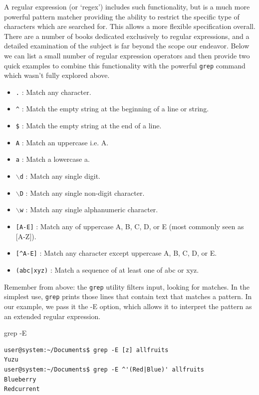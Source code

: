 \documentclass[11pt]{article}
\begin{document}
A regular expression (or `regex') includes such functionality, but is a much more powerful pattern matcher providing the ability to restrict the specific type of characters which are searched for. This allows a more flexible specification overall. There are a number of books dedicated exclusively to regular expressions, and a detailed examination of the subject is far beyond the scope our endeavor. Below we can list a small number of regular expression operators and then provide two quick examples to combine this functionality with the powerful \texttt{grep} command which wasn't fully explored above.

\begin{itemize}
\item \texttt{.} : Match any character.
\item \texttt{\^{}} : Match the empty string at the beginning of a line or string.
\item \texttt{\$} : Match the empty string at the end of a line.
\item \texttt{A} : Match an uppercase i.e. A.
\item \texttt{a} : Match a lowercase a.
\item \texttt{$\backslash$d} : Match any single digit.
\item \texttt{$\backslash$D} : Match any single non-digit character.
\item \texttt{$\backslash$w} : Match any single alphanumeric character.
\item \texttt{[A-E]} : Match any of uppercase A, B, C, D, or E (most commonly seen as [A-Z]).
\item \texttt{[\^{}A-E]} : Match any character except uppercase A, B, C, D, or E.
\item \texttt{(abc|xyz)} : Match a sequence of at least one of abc or xyz. 
\end{itemize}

Remember from above: the \texttt{grep} utility filters input, looking for matches. In the simplest use, \texttt{grep} prints those lines that contain text that matches a pattern. In our example, we pass it the -E option, which allows it to interpret the pattern as an extended regular expression.\\

\begin{listing}[H]
\caption{grep -E}\vspace{-0.1in}
\begin{verbatim}
user@system:~/Documents$ grep -E [z] allfruits
Yuzu
user@system:~/Documents$ grep -E ^'(Red|Blue)' allfruits
Blueberry
Redcurrent
\end{verbatim}
\end{listing}
\end{document}
